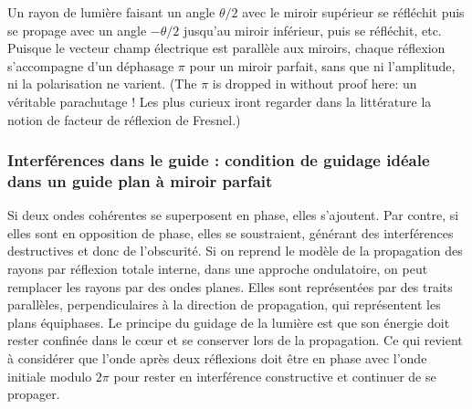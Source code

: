 Un rayon de lumière faisant un angle $\theta/2$ avec le miroir supérieur se
réfléchit puis se propage avec un angle $-\theta/2$ jusqu'au miroir inférieur,
puis se réfléchit, etc. Puisque le vecteur champ électrique est parallèle aux
miroirs, chaque réflexion s'accompagne d'un déphasage $\pi$ pour un miroir
parfait, sans que ni l'amplitude, ni la polarisation ne varient. (The $\pi$ is
dropped in without proof here: un véritable parachutage ! Les plus curieux iront regarder dans la littérature la notion de facteur de
réflexion de Fresnel.)

\subsubsection{Interférences dans le guide : condition de guidage idéale dans un guide plan à miroir parfait}
Si deux ondes cohérentes se superposent en phase, elles s'ajoutent. Par contre,
si elles sont en opposition de phase, elles se soustraient, générant des
interférences destructives et donc de l'obscurité. Si on reprend le modèle de
la propagation des rayons par réflexion totale interne, dans une approche
ondulatoire, on peut remplacer les rayons par des ondes planes. Elles sont
représentées par des traits parallèles, perpendiculaires à la direction de
propagation, qui représentent les plans équiphases. Le principe du guidage de la lumière est que son énergie
doit rester confinée dans le cœur et se conserver lors de la propagation. Ce
qui revient à considérer que l'onde après deux réflexions doit être en phase
avec l'onde initiale modulo $2\pi$ pour rester en interférence constructive et
continuer de se propager.

